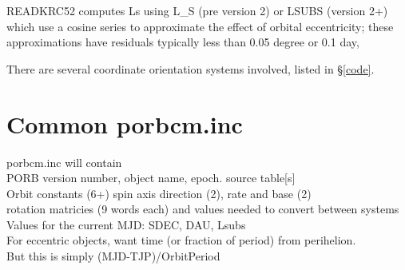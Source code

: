 \documentclass[draft]{article}
\newcommand{\qi}{\\ \hspace*{2.em}}      %
\newcommand{\qii}{\\ \hspace*{4.em}}     %
\begin{document}
READKRC52 computes Ls using L\_S (pre version 2) or LSUBS (version 2+) which use
a cosine series to approximate the effect of orbital eccentricity; these
approximations have residuals typically less than 0.05 degree or 0.1 day,
 
There are several coordinate orientation systems involved, listed in \S \ref{code}.

\section{Common porbcm.inc}  %

porbcm.inc will contain
\qi PORB version number, object name, epoch. source table[s]
\qi Orbit constants (6+) spin axis direction (2), rate and base (2)
\qi rotation matricies (9 words each) and values needed to convert between systems
\qi Values for the current MJD: SDEC, DAU, Lsubs
\qi For eccentric objects, want time (or fraction of period) from perihelion.
\qii But this is simply (MJD-TJP)/OrbitPeriod
\end{document}
